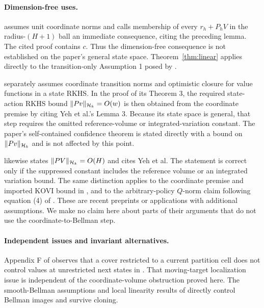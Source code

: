 \paragraph{Dimension-free uses.}
\citet[Assumption 1 and Lemma 1]{vakili2023kernel} assumes unit coordinate norms and
calls membership of every $r_h+P_hV$ in the radius-$(H+1)$ ball an immediate
consequence, citing the preceding lemma. The cited proof contains $c$. Thus the
dimension-free consequence is not established on the paper's general state space.
Theorem~\ref{thm:linear} applies directly to the transition-only Assumption 1 posed
by \citet{vakili2024open}.

\citet[Assumptions 2 and 4]{vakili2024average} separately assumes coordinate
transition norms and optimistic closure for value functions in a state RKHS. In
the proof of its Theorem 3, the required state-action RKHS bound
$\|Pv\|_{\mathcal H_k}=O(w)$ is then obtained from the coordinate premise by citing Yeh et
al.'s Lemma 3. Because its state space is general, that step requires the omitted
reference-volume or integrated-variation constant. The paper's self-contained
confidence theorem is stated directly with a bound on $\|Pv\|_{\mathcal H_k}$ and is not
affected by this point.

\citet[Assumption 1]{kayal2025rewardfree} likewise states
$\|PV\|_{\mathcal H_k}=O(H)$ and cites Yeh et al. The statement is correct only if the
suppressed constant includes the reference volume or an integrated variation
bound. The same distinction applies to the coordinate premise and imported KOVI
bound in \citet{cioba2026invariances}, and to the arbitrary-policy $Q$-norm claim
following equation (4) of \citet{pavlovic2026preferences}. These are recent
preprints or applications with additional assumptions. We make no claim here about
parts of their arguments that do not use the coordinate-to-Bellman step.

\paragraph{Independent issues and invariant alternatives.}
Appendix F of \citet{maran2024local} observes that a cover restricted to a current
partition cell does not control values at unrestricted next states in
\citet{vakili2023kernel}. That moving-target localization issue is independent of
the coordinate-volume obstruction proved here. The smooth-Bellman assumptions and
local linearity results of \citet{maran2024local,maran2024smooth} directly control
Bellman images and survive cloning.


